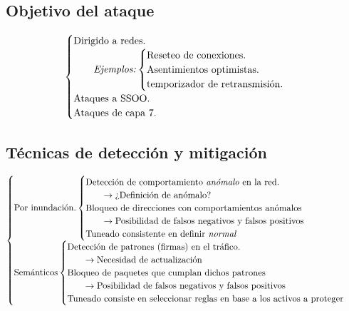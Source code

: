 \begin{Resumen}
\subsection*{Objetivo del ataque}
\begin{align*}
 \begin{cases}
   \text{Dirigido a redes.}\\
   \qquad{\text{\emph{Ejemplos:}}}
   \begin{cases}
     \text{Reseteo de conexiones.} \\
     \text{Asentimientos optimistas.} \\
     \text{temporizador de retransmisión.} \\
   \end{cases}\\
   \text{Ataques a SSOO.} \\
   \text{Ataques de capa 7.}\\
 \end{cases}
\end{align*}

\subsection*{Técnicas de detección y mitigación}
\begin{align*}
 \begin{cases}
   \text{Por inundación.}
   \begin{cases}
     \text{Detección de comportamiento \emph{anómalo} en la red.} \\
     \qquad\rightarrow\text{¿Definición de anómalo?} \\
     \text{Bloqueo de direcciones con comportamientos anómalos}\\
     \qquad\rightarrow\text{Posibilidad de falsos negativos y falsos positivos}\\
     \text{Tuneado consistente en definir \emph{normal}}
   \end{cases}\\
   \text{Semánticos}
   \begin{cases}
     \text{Detección de patrones (firmas) en el tráfico.} \\
     \qquad\rightarrow\text{Necesidad de actualización} \\
     \text{Bloqueo de paquetes que cumplan dichos patrones}\\
     \qquad\rightarrow\text{Posibilidad de falsos negativos y falsos positivos} \\
     \text{Tuneado consiste en seleccionar reglas en base a los activos a proteger}
   \end{cases}\\
 \end{cases}
\end{align*}

\end{Resumen}

